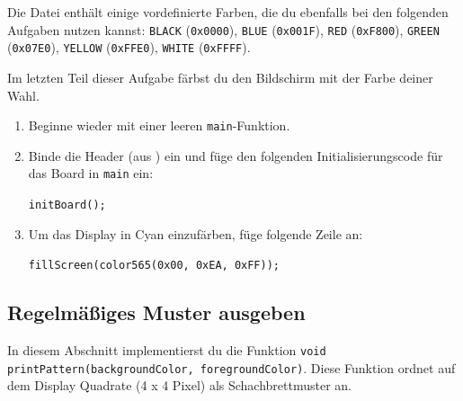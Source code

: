 Die Datei  enthält einige vordefinierte Farben, die du ebenfalls bei den folgenden Aufgaben nutzen kannst: 
\lstinline|BLACK| (\lstinline|0x0000|), \lstinline|BLUE| (\lstinline|0x001F|), \lstinline|RED| (\lstinline|0xF800|), 
\lstinline|GREEN| (\lstinline|0x07E0|), \lstinline|YELLOW| (\lstinline|0xFFE0|), \lstinline|WHITE| (\lstinline|0xFFFF|).

Im letzten Teil dieser Aufgabe färbst du den Bildschirm mit der Farbe deiner Wahl.
\begin{enumerate}
\item 
Beginne wieder mit einer leeren \lstinline|main|-Funktion.
\item 
Binde die Header  (aus ) ein und füge den folgenden Initialisierungscode für das Board in \lstinline|main| ein:

\lstinline|initBoard();|

\item 
Um das Display in Cyan einzufärben, füge folgende Zeile an:

\lstinline|fillScreen(color565(0x00, 0xEA, 0xFF));|
\end{enumerate}


\subsection{Regelmäßiges Muster ausgeben}
In diesem Abschnitt implementierst du die Funktion \lstinline|void printPattern(backgroundColor, foregroundColor)|.
Diese Funktion ordnet auf dem Display Quadrate (4 x 4 Pixel) als Schachbrettmuster an.
%



